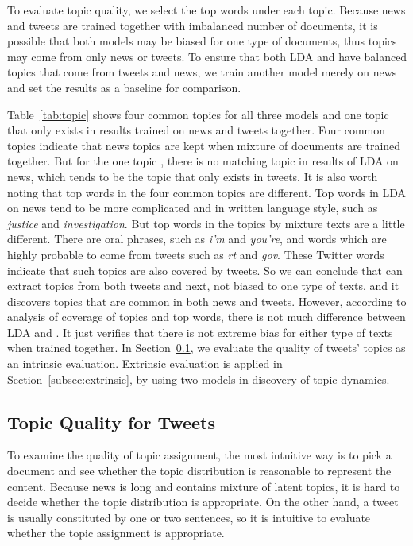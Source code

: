 To evaluate topic quality, we select the top words under each topic. Because news and tweets are trained together with imbalanced number of documents, it is possible that both models may be biased for one type of documents, thus topics may come from only news or tweets. To ensure that both LDA and \stlda have balanced topics that come from tweets and news, we train another model merely on news and set the results as a baseline for comparison.

Table~\ref{tab:topic} shows four common topics for all three models and one topic that only exists in results trained on news and tweets together. Four common topics indicate that news topics are kept when mixture of documents are trained together. But for the one topic \pray, there is no matching topic in results of LDA on news, which tends to be the topic that only exists in tweets. It is also worth noting that top words in the four common topics are different. Top words in LDA on news tend to be more complicated and in written language style, such as \emph{justice} and \emph{investigation}. But top words in the topics by mixture texts are a little different. There are oral phrases, such as \emph{i'm} and \emph{you're}, and words which are highly probable to come from tweets such as \emph{rt} and \emph{gov}. These Twitter words indicate that such topics are also covered by tweets. So we can conclude that \stlda can extract topics from both tweets and next, not biased to one type of texts, and it discovers topics that are common in both news and tweets. However, according to analysis of coverage of topics and top words, there is not much difference between LDA and \stlda. It just verifies that there is not extreme bias for either type of texts when trained together. In Section~\ref{subsec:intrinsic}, we evaluate the quality of tweets' topics as an intrinsic evaluation. Extrinsic evaluation is applied in Section~\ref{subsec:extrinsic}, by using two models in discovery of topic dynamics.

\subsection{Topic Quality for Tweets}
\label{subsec:intrinsic}

To examine the quality of topic assignment, the most intuitive way is to pick a document and see whether the topic distribution is reasonable to represent the content. Because news is long and contains mixture of latent topics, it is hard to decide whether the topic distribution is appropriate. On the other hand, a tweet is usually constituted by one or two sentences, so it is intuitive to evaluate whether the topic assignment is appropriate.

